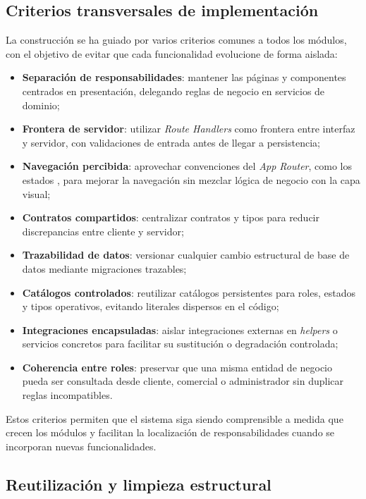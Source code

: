 \subsection{Criterios transversales de implementación}

La construcción se ha guiado por varios criterios comunes a todos los módulos, con el objetivo de evitar que cada funcionalidad evolucione de forma aislada:

\begin{itemize}
    \item \textbf{Separación de responsabilidades}: mantener las páginas y componentes centrados en presentación, delegando reglas de negocio en servicios de dominio;
    \item \textbf{Frontera de servidor}: utilizar \textit{Route Handlers} como frontera entre interfaz y servidor, con validaciones de entrada antes de llegar a persistencia;
    \item \textbf{Navegación percibida}: aprovechar convenciones del \textit{App Router}, como los estados , para mejorar la navegación sin mezclar lógica de negocio con la capa visual;
    \item \textbf{Contratos compartidos}: centralizar contratos y tipos para reducir discrepancias entre cliente y servidor;
    \item \textbf{Trazabilidad de datos}: versionar cualquier cambio estructural de base de datos mediante migraciones trazables;
    \item \textbf{Catálogos controlados}: reutilizar catálogos persistentes para roles, estados y tipos operativos, evitando literales dispersos en el código;
    \item \textbf{Integraciones encapsuladas}: aislar integraciones externas en \textit{helpers} o servicios concretos para facilitar su sustitución o degradación controlada;
    \item \textbf{Coherencia entre roles}: preservar que una misma entidad de negocio pueda ser consultada desde cliente, comercial o administrador sin duplicar reglas incompatibles.
\end{itemize}

Estos criterios permiten que el sistema siga siendo comprensible a medida que crecen los módulos y facilitan la localización de responsabilidades cuando se incorporan nuevas funcionalidades.

\subsection{Reutilización y limpieza estructural}

